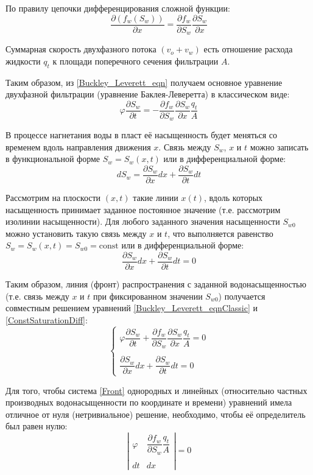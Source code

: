 \documentclass[a4paper,14pt]{extarticle}
\newcommand{\beq}{\begin{equation}}
\newcommand{\eeq}{\end{equation}}
\begin{document}
По правилу цепочки дифференцирования сложной функции:
$$
\frac{\partial\!\left(f_w(S_w)\right)}{\partial x}=\frac{\partial f_w}{\partial S_w}\frac{\partial S_w}{\partial x}
$$

Суммарная скорость двухфазного потока $\left(v_o+v_w\right)$ есть отношение расхода жидкости $q_t$ к площади поперечного сечения фильтрации $A$.

Таким образом, из \eqref{Buckley_Leverett_eqn} получаем основное уравнение двухфазной фильтрации (уравнение Баклея-Леверетта) в классическом виде:
\beq\label{Buckley_Leverett_eqnClassic}
\varphi\frac{\partial S_w}{\partial t}=-\frac{\partial f_w}{\partial S_w}\frac{\partial S_w}{\partial x}\frac{q_t}{A}
\eeq

В процессе нагнетания воды в пласт её насыщенность будет меняться со временем вдоль направления движения $x$.
Связь между $S_w$, $x$ и $t$ можно записать в функциональной форме $S_w=S_w(x,t)$ или в дифференциальной форме:
\beq
dS_w=\frac{\partial S_w}{\partial x}dx+\frac{\partial S_w}{\partial t}dt
\eeq

Рассмотрим на плоскости $(x,t)$ такие линии $x(t)$, вдоль которых насыщенность принимает заданное постоянное значение (т.е. рассмотрим изолинии насыщенности).
Для любого заданного значения насыщенности $S_{w0}$ можно установить такую связь между $x$ и $t$, что выполняется равенство $S_w=S_w(x,t)=S_{w0}=\text{const}$ или в дифференциальной форме:
\beq\label{ConstSaturationDiff}
\frac{\partial S_w}{\partial x}dx+\frac{\partial S_w}{\partial t}dt=0
\eeq

Таким образом, линия (фронт) распространения с заданной водонасыщенностью (т.е. связь между $x$ и $t$ при фиксированном значении $S_{w0}$) получается совместным решением уравнений \eqref{Buckley_Leverett_eqnClassic} и \eqref{ConstSaturationDiff}:
\beq\label{Front}
\begin{cases}
\varphi\dfrac{\partial S_w}{\partial t}+\dfrac{\partial f_w}{\partial S_w}\dfrac{\partial S_w}{\partial x}\dfrac{q_t}{A}=0 \\\\
\dfrac{\partial S_w}{\partial x}dx+\dfrac{\partial S_w}{\partial t}dt=0
\end{cases}
\eeq

Для того, чтобы система \eqref{Front} однородных и линейных (относительно частных производных водонасыщенности по координате и времени) уравнений имела отличное от нуля (нетривиальное) решение, необходимо, чтобы её определитель был равен нулю:
\beq
\left\lvert
\begin{matrix}
\varphi & \dfrac{\partial f_w}{\partial S_w}\dfrac{q_t}{A}\\\\
dt & dx
\end{matrix}
\right\rvert=0
\eeq
\end{document}
